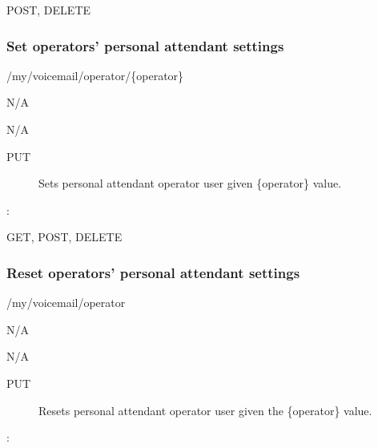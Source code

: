 \documentclass[letterpaper,10pt,english]{sphinxmanual}
\begin{document}
 POST, DELETE


\subsubsection{Set operators’ personal attendant settings}
\label{\detokenize{restapi:set-operators-personal-attendant-settings}}
 /my/voicemail/operator/\{operator\}

 N/A

 N/A
\begin{description}
\item[{ PUT}] \leavevmode
Sets personal attendant operator user given \{operator\} value.

\end{description}

:

\begin{sphinxVerbatim}[commandchars=\\\{\}]
\end{sphinxVerbatim}

 GET, POST, DELETE


\subsubsection{Reset operators’ personal attendant settings}
\label{\detokenize{restapi:reset-operators-personal-attendant-settings}}
 /my/voicemail/operator

 N/A

 N/A
\begin{description}
\item[{ PUT}] \leavevmode
Resets personal attendant operator user given the \{operator\} value.

\end{description}

:

\begin{sphinxVerbatim}[commandchars=\\\{\}]
\end{sphinxVerbatim}
\end{document}
